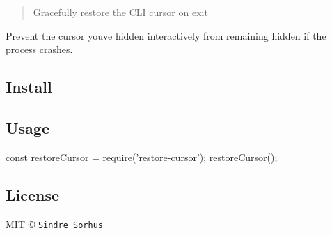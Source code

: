 \begin{quote}
Gracefully restore the C\+LI cursor on exit \end{quote}


Prevent the cursor you\textquotesingle{}ve hidden interactively from remaining hidden if the process crashes.

\subsection*{Install}




\subsection*{Usage}


\begin{DoxyCode}
const restoreCursor = require('restore-cursor');
restoreCursor();
\end{DoxyCode}


\subsection*{License}

M\+IT © \href{https://sindresorhus.com}{\tt Sindre Sorhus} 